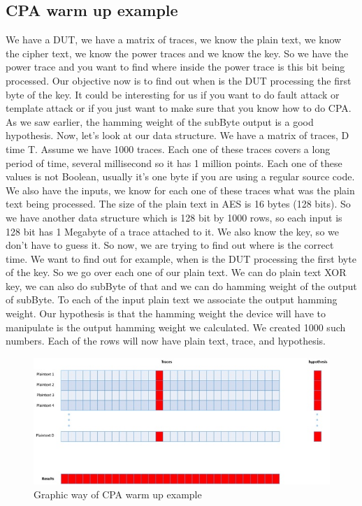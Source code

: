\subsection{CPA warm up example}\label{c8_CPA_warm_up_example:subsec}
We have a DUT, we have a matrix of traces, we know the plain text, we know the cipher text, we know the power traces and we know the key. So we have the power trace and you want to find where inside the power trace is this bit being processed. Our objective now is to find out when is the DUT processing the first byte of the key. It could be interesting for us if you want to do fault attack or template attack or if you just want to make sure that you know how to do CPA. As we saw earlier, the hamming weight of the subByte output is a good hypothesis.
Now, let’s look at our data structure. We have a matrix of traces, D time T. Assume we have 1000 traces. Each one of these traces covers a long period of time, several millisecond so it has 1 million points. Each one of these values is not Boolean, usually it’s one byte if you are using a regular source code. We also have the inputs, we know for each one of these traces what was the plain text being processed. The size of the plain text in AES is 16 bytes (128 bits). So we have another data structure which is 128 bit by 1000 rows, so each input is 128 bit has 1 Megabyte of a trace attached to it. We also know the key, so we don’t have to guess it. So now, we are trying to find out where is the correct time. We want to find out for example, when is the DUT processing the first byte of the key. So we go over each one of our plain text. We can do plain text XOR key, we can also do subByte of that and we can do hamming weight of the output of subByte. To each of the input plain text we associate the output hamming weight. Our hypothesis is that the hamming weight the device will have to manipulate is the output hamming weight we calculated. We created 1000 such numbers. Each of the rows will now have plain text, trace, and hypothesis.
\begin{figure}[H]
    \centering
    \includegraphics[width=1.0\textwidth]{images/chapter8/cpa_warmup_example.jpg}
    \caption{Graphic way of CPA warm up example} \label{c8_cpa_warmup_example:fig}
\end{figure}
